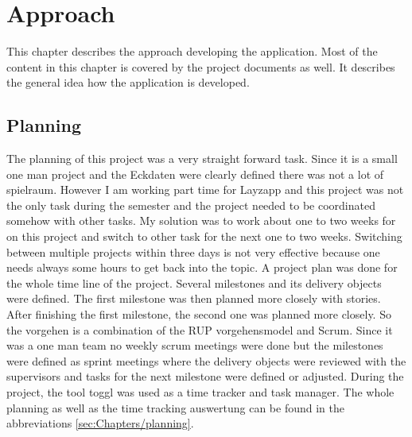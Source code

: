 
\chapter{Approach} %

\label{ChapterX} %



This chapter describes the approach developing the application. Most of the content in this chapter is covered by the project documents as well. It describes the general idea how the application is developed. 


\section{Planning}

The planning of this project was a very straight forward task. Since it is a small one man project and the Eckdaten were clearly defined there was not a lot of spielraum.  However I am working part time for Layzapp and this project was not the only task during the semester and the project needed to be coordinated somehow with other tasks. My solution was to work about one to two weeks for on this project and switch to other task for the next one to two weeks. Switching between multiple projects within three days is not very effective because one needs always some hours to get back into the topic. 
A project plan was done for the whole time line of the project. Several milestones and its delivery objects were defined. The first milestone was then planned more closely with stories. After finishing the first milestone, the second one was planned more closely. So the vorgehen is a combination of the RUP vorgehensmodel and Scrum. Since it was a one man team no weekly scrum meetings were done but the milestones were defined as sprint meetings where the delivery objects were reviewed with the supervisors and tasks for the next milestone were defined or adjusted. During the project, the tool toggl was used as a time tracker and task manager. The whole planning as well as the time tracking auswertung can be found in the abbreviations \ref{sec:Chapters/planning}.

